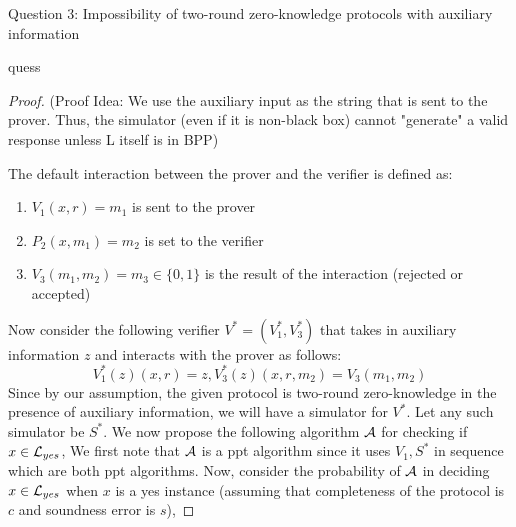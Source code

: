 \begin{solution}{Question 3: Impossibility of two-round zero-knowledge protocols with auxiliary information}\label{ques:1}
    \begin{question}
    quess
    \end{question}
    \tcblower{}
    \begin{proof}
        (Proof Idea: We use the auxiliary input as the string that is sent to the prover. Thus, the simulator (even if it is non-black box) cannot "generate" a valid response unless L itself is in BPP)\par
        The default interaction between the prover and the verifier is defined as:
        \begin{enumerate}
            \item $V_1(x, r) = m_1$ is sent to the prover
            \item $P_2(x, m_1) = m_2$ is set to the verifier
            \item $V_3(m_1, m_2) = m_3 \in \{0, 1\}$ is the result of the interaction (rejected or accepted)
        \end{enumerate}
        Now consider the following verifier $V^* = (V_1^*, V_3^*)$ that takes in auxiliary information $z$ and interacts with the prover as follows:
        \begin{equation}
            V_1^*(z)(x, r) = z, V_3^*(z)(x, r, m_2) = V_3(m_1, m_2)
        \end{equation}
        Since by our assumption, the given protocol is two-round zero-knowledge in the presence of auxiliary information, we will have a simulator for $V^*$. Let any such simulator be $S^*$. We now propose the following algorithm $\mathcal{A}$ for checking if $x \in \mathcal{L}_{yes}$,
        We first note that $\mathcal{A}$ is a ppt algorithm since it uses $V_1, S^*$ in sequence which are both ppt algorithms. Now, consider the probability of $\mathcal{A}$ in deciding $x \in \mathcal{L}_{yes}$ when $x$ is a yes instance (assuming that completeness of the protocol is $c$ and soundness error is $s$),

\end{proof}
\end{solution}
